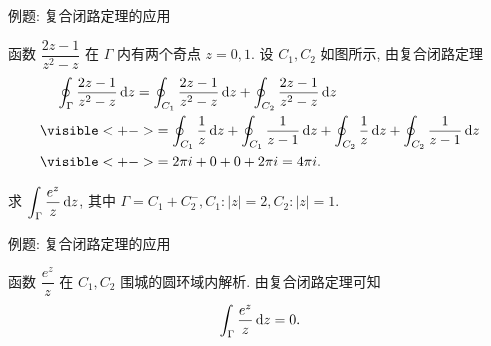 \begin{frame}{例题: 复合闭路定理的应用}
\begin{solution}
函数 $\dfrac{2z-1}{z^2-z}$ 在 $\Gamma$ 内有两个奇点 $z=0,1$.
\onslide<+->
设 $C_1,C_2$ 如图所示,
\onslide<+->
由复合闭路定理
\begin{align*}
&\peq\oint_\Gamma\frac{2z-1}{z^2-z}\diff z
=\oint_{C_1}\frac{2z-1}{z^2-z}\diff z+\oint_{C_2}\frac{2z-1}{z^2-z}\diff z\\
&\visible<+->{=\oint_{C_1}\frac1z\diff z+\oint_{C_1}\frac1{z-1}\diff z
+\oint_{C_2}\frac1z\diff z+\oint_{C_2}\frac1{z-1}\diff z}\\
&\visible<+->{=2\pi i+0+0+2\pi i=4\pi i.}
\end{align*}
\end{solution}

\begin{example}
求 $\displaystyle\int_\Gamma\frac{e^z}z\,\mathrm{d} z$, 其中 $\Gamma=C_1+C_2^-,C_1:|z|=2,C_2:|z|=1$.
\end{example}
\end{frame}


\begin{frame}{例题: 复合闭路定理的应用}
\begin{solution}
\begin{center}
\end{center}
\onslide<+->
函数 $\dfrac{e^z}z$ 在 $C_1,C_2$ 围城的圆环域内解析.
\onslide<+->
由复合闭路定理可知 
\[\int_\Gamma\frac{e^z}z\,\mathrm{d} z=0.\]
\end{solution}
\end{frame}


